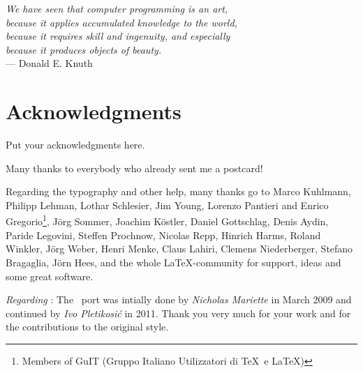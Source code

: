 
\begin{flushright}{\slshape    
    We have seen that computer programming is an art, \\ 
    because it applies accumulated knowledge to the world, \\ 
    because it requires skill and ingenuity, and especially \\
    because it produces objects of beauty.} \\ \medskip
    --- Donald E. Knuth
\end{flushright}

\bigskip

\begingroup
\let\clearpage\relax
\let\cleardoublepage\relax
\let\cleardoublepage\relax
\chapter*{Acknowledgments}
Put your acknowledgments here.

Many thanks to everybody who already sent me a postcard!

Regarding the typography and other help, many thanks go to Marco 
Kuhlmann, Philipp Lehman, Lothar Schlesier, Jim Young, Lorenzo 
Pantieri and Enrico Gregorio\footnote{Members of GuIT (Gruppo 
Italiano Utilizzatori di \TeX\ e \LaTeX )}, J\"org Sommer, 
Joachim K\"ostler, Daniel Gottschlag, Denis Aydin, Paride 
Legovini, Steffen Prochnow, Nicolas Repp, Hinrich Harms, 
 Roland Winkler, Jörg Weber, Henri Menke, Claus Lahiri, 
 Clemens Niederberger, Stefano Bragaglia, Jörn Hees, 
 and the whole \LaTeX-community for support, ideas and 
 some great software.

\bigskip

\noindent\emph{Regarding \mLyX}: The \mLyX\ port was intially done by 
\emph{Nicholas Mariette} in March 2009 and continued by 
\emph{Ivo Pletikosi\'c} in 2011. Thank you very much for your 
work and for the contributions to the original style.


\endgroup



